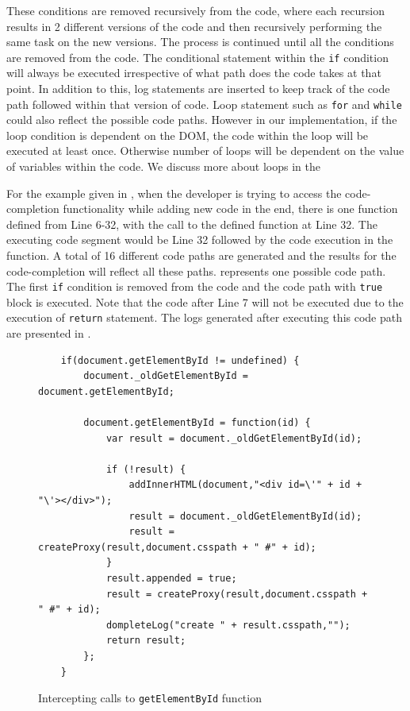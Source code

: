 		These conditions are removed recursively from the code, where each recursion results in 2 different versions of the code and then recursively performing the same task on the new versions. The process is continued until all the conditions are removed from the code. The conditional statement within the \texttt{if} condition will always be executed irrespective of what path does the code takes at that point. In addition to this, log statements are inserted to keep track of the code path followed within that version of code. Loop statement such as \texttt{for} and \texttt{while} could also reflect the possible code paths. However in our implementation, if the loop condition is dependent on the DOM, the code within the loop will be executed at least once. Otherwise number of loops will be dependent on the value of variables within the code. We discuss more about loops in the 
		
		For the example given in , when the developer is trying to access the code-completion functionality while adding new code in the end, there is one function defined from Line 6-32, with the call to the defined function at Line 32. The executing code segment would be Line 32 followed by the code execution in the function. A total of 16 different code paths are generated and the results for the code-completion will reflect all these paths.  represents one possible code path. The first \texttt{if} condition is removed from the code and the code path with \texttt{true} block is executed. Note that the code after Line 7 will not be executed due to the execution of \texttt{return} statement. The logs generated after executing this code path are presented in .	
		
		
				
			\begin{figure}
			\medskip
			\begin{lstlisting}
	if(document.getElementById != undefined) { 
		document._oldGetElementById = document.getElementById; 
			
		document.getElementById = function(id) { 
			var result = document._oldGetElementById(id); 
				
			if (!result) { 
				addInnerHTML(document,"<div id=\'" + id + "\'></div>"); 
				result = document._oldGetElementById(id); 
				result = createProxy(result,document.csspath + " #" + id); 
			} 
			result.appended = true;
			result = createProxy(result,document.csspath + " #" + id);
			dompleteLog("create " + result.csspath,"");
			return result; 
		}; 
	}
			\end{lstlisting}
			\caption{Intercepting calls to \texttt{getElementById} function}
			\label{Fig:Environment}
			\end{figure}
			
